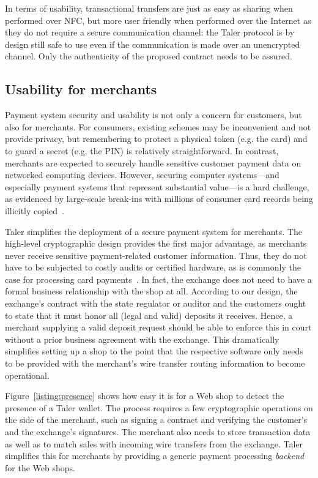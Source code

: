 \documentclass{IEEEtran}
\begin{document}
In terms of usability, transactional
transfers are just as easy as sharing when performed over NFC, but
more user friendly when performed over the Internet as they do not
require a secure communication channel: the Taler protocol is by
design still safe to use even if the communication is made over an
unencrypted channel. Only the authenticity of the proposed contract
needs to be assured.


\subsection{Usability for merchants}

Payment system security and usability is not only a concern for
customers, but also for merchants.  For consumers, existing schemes
may be inconvenient and not provide privacy, but remembering to
protect a physical token (e.g. the card) and to guard a secret
(e.g. the PIN) is relatively straightforward.  In contrast, merchants
are expected to securely handle sensitive customer payment data on
networked computing devices.  However, securing computer systems---and
especially payment systems that represent substantial value---is a
hard challenge, as evidenced by large-scale break-ins with millions of
consumer card records being illicitly copied~\cite{target}.

Taler simplifies the deployment of a secure payment system for
merchants. The high-level cryptographic design
provides the first major advantage, as merchants never
receive sensitive payment-related customer information.  Thus, they do
not have to be subjected to costly audits or certified hardware, as is
commonly the case for processing card payments~\cite{pcidss}. In fact,
the exchange does not need to have a formal business relationship with
the shop at all.  According to our design, the exchange's contract
with the state regulator or auditor and the customers ought to state
that it must honor all (legal and valid) deposits it receives.  Hence,
a merchant supplying a valid deposit request should be able to enforce
this in court without a prior business agreement with the exchange.
This dramatically simplifies setting up a shop to the point that the
respective software only needs to be provided with the merchant's wire
transfer routing information to become operational.

Figure~\ref{listing:presence} shows how easy it is for a Web shop to
detect the presence of a Taler wallet.  The process requires a few
cryptographic operations on the side of the merchant, such as signing
a contract and verifying the customer's and the exchange's signatures.
The merchant also needs to store transaction data as well as to match
sales with incoming wire transfers from the exchange.  Taler
simplifies this for merchants by providing a generic payment
processing {\em backend} for the Web shops.
\end{document}
